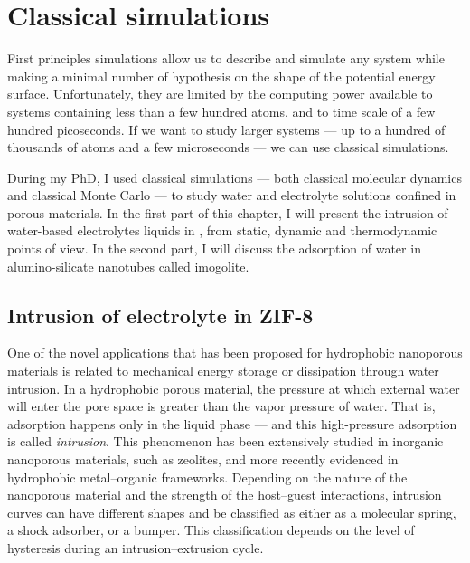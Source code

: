 \documentclass[thesis]{subfiles}
\begin{document}
\OnlyInSubfile{\setcounter{chapter}{4}}
\chapter{Classical simulations}

\baselineskip
First principles simulations allow us to describe and simulate any system while
making a minimal number of hypothesis on the shape of the potential energy
surface. Unfortunately, they are limited by the computing power available to
systems containing less than a few hundred atoms, and to time scale of a few
hundred picoseconds. If we want to study larger systems --- up to a hundred of
thousands of atoms and a few microseconds --- we can use classical simulations.

During my PhD, I used classical simulations --- both classical molecular
dynamics and classical Monte Carlo --- to study water and electrolyte solutions
confined in porous materials. In the first part of this chapter, I will present
the intrusion of water-based electrolytes liquids in , from static, dynamic
and thermodynamic points of view. In the second part, I will discuss the
adsorption of water in alumino-silicate nanotubes called imogolite.

\newpage
\section{Intrusion of electrolyte in ZIF-8}

One of the novel applications that has been proposed for hydrophobic nanoporous
materials is related to mechanical energy storage or dissipation through water
intrusion\cite{Eroshenko2001, Soulard2004}. In a hydrophobic porous material,
the pressure at which external water will enter the pore space is greater than
the vapor pressure of water. That is, adsorption happens only in the liquid
phase --- and this high-pressure adsorption is called
\emph{intrusion}\cite{Fraux2017}. This phenomenon has been extensively studied
in inorganic nanoporous materials, such as zeolites\cite{Saada2010,
Desbiens2005, Humplik2014a, Humplik2014b}, and more recently evidenced in
hydrophobic metal--organic frameworks\cite{Ortiz2013, Grosu2015,
MichelinJamois2015}. Depending on the nature of the nanoporous material and the
strength of the host--guest interactions, intrusion curves can have different
shapes and be classified as either as a molecular spring, a shock adsorber, or a
bumper. This classification depends on the level of hysteresis during an
intrusion--extrusion cycle.
\end{document}
